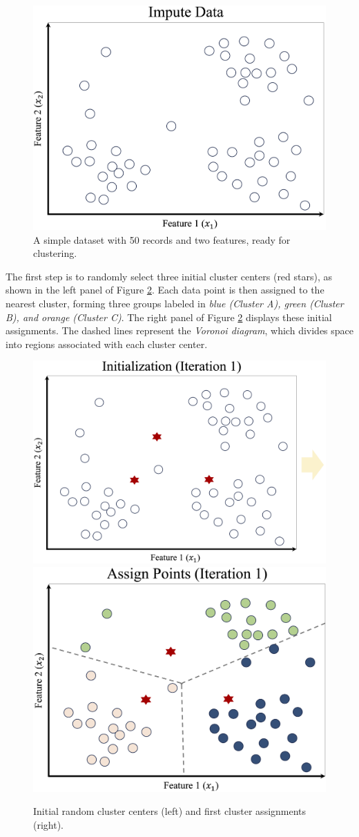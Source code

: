 \documentclass[
]{book}
\theoremstyle{definition}
\theoremstyle{definition}
\theoremstyle{definition}
\theoremstyle{definition}
\theoremstyle{remark}
\begin{document}
\begin{figure}

{\centering \includegraphics[width=0.7\linewidth]{images/ch13_cluster_ex_1} 

}

\caption{A simple dataset with 50 records and two features, ready for clustering.}\label{fig:cluster-ex-1}
\end{figure}

The first step is to randomly select three initial cluster centers (red stars), as shown in the left panel of Figure \ref{fig:cluster-ex-2}. Each data point is then assigned to the nearest cluster, forming three groups labeled in \emph{blue (Cluster A), green (Cluster B), and orange (Cluster C)}. The right panel of Figure \ref{fig:cluster-ex-2} displays these initial assignments. The dashed lines represent the \emph{Voronoi diagram}, which divides space into regions associated with each cluster center.

\begin{figure}

{\centering \includegraphics[width=0.45\linewidth]{images/ch13_cluster_ex_2} \includegraphics[width=0.45\linewidth]{images/ch13_cluster_ex_3} 

}

\caption{Initial random cluster centers (left) and first cluster assignments (right).}\label{fig:cluster-ex-2}
\end{figure}
\end{document}
